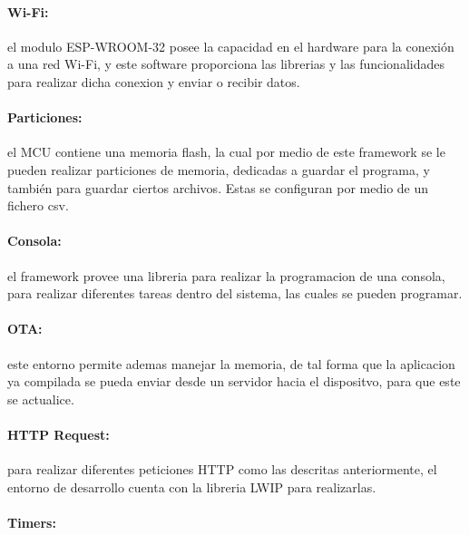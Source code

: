 \paragraph{Wi-Fi:}el modulo ESP-WROOM-32 posee la capacidad en el hardware para la conexión a una red Wi-Fi, y este software proporciona las librerias y las funcionalidades para realizar dicha conexion y enviar o recibir datos.


\paragraph{Particiones:}el MCU contiene una memoria flash, la cual por medio de este framework se le pueden realizar particiones de memoria, dedicadas a guardar el programa, y también para guardar ciertos archivos. Estas se configuran por medio de un fichero csv.


\paragraph{Consola:}el framework provee una libreria para realizar la programacion de una consola, para realizar diferentes tareas dentro del sistema, las cuales se pueden programar.


\paragraph{OTA:}este entorno permite ademas manejar la memoria, de tal forma que la aplicacion ya compilada se pueda enviar desde un servidor hacia el dispositvo, para que este se actualice.


\paragraph{HTTP Request:}para realizar diferentes peticiones HTTP como las descritas anteriormente, el entorno de desarrollo cuenta con la libreria LWIP para realizarlas.

\paragraph{Timers:}

